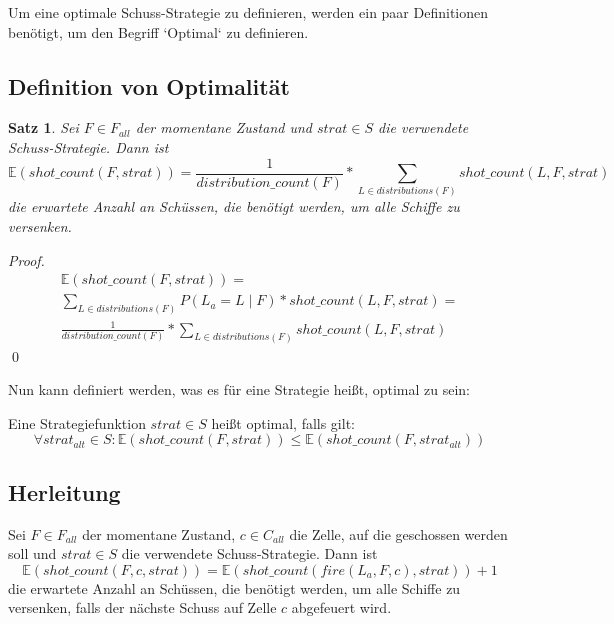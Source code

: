 \documentclass[a4paper,12pt]{llncs}
\numberwithin{equation}{section}
\newtheorem{satz}{Satz}
\begin{document}
Um eine optimale Schuss-Strategie zu definieren, werden ein paar Definitionen benötigt, um den Begriff `Optimal` zu definieren.

\subsection{Definition von Optimalität}

\begin{satz}
Sei $F\in F_{all}$ der momentane Zustand und $strat \in S$ die verwendete Schuss-Strategie.
Dann ist
\[
\mathds{E}(shot\_count(F, strat))=\frac{1}{distribution\_count(F)} * \sum_{L \in distributions(F)}{shot\_count(L, F, strat)}
\]
die erwartete Anzahl an Schüssen, die benötigt werden, um alle Schiffe zu versenken.
\end{satz}

\begin{proof}
\begin{align}
\mathds{E}(shot\_count(F, strat))=\\
\sum_{L \in distributions(F)}{P(L_a= L \mid F) * shot\_count(L, F, strat)} =\\
\frac{1}{distribution\_count(F)} * \sum_{L \in distributions(F)}{shot\_count(L, F, strat)}
\end{align}
\qed
\end{proof}

Nun kann definiert werden, was es für eine Strategie heißt, optimal zu sein:
\begin{definition}
Eine Strategiefunktion $strat \in S$ heißt optimal, falls gilt:
\[
\forall strat_{alt} \in S \colon \mathds{E}(shot\_count(F, strat)) \leq \mathds{E}(shot\_count(F, strat_{alt}))
\]
\end{definition}

\subsection{Herleitung}

\begin{lemma}
Sei $F\in F_{all}$ der momentane Zustand, $c\in C_{all}$ die Zelle, auf die geschossen werden soll und $strat \in S$ die verwendete Schuss-Strategie.
Dann ist
\[
\mathds{E}(shot\_count(F, c, strat))=\mathds{E}(shot\_count(fire(L_a, F, c), strat)) + 1
\]
die erwartete Anzahl an Schüssen, die benötigt werden, um alle Schiffe zu versenken, falls der nächste Schuss auf Zelle $c$ abgefeuert wird.
\end{lemma}
\end{document}
